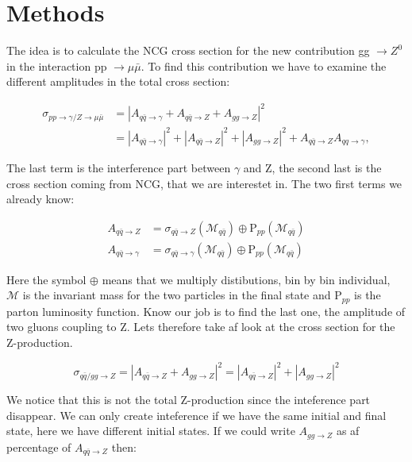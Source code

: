 \section{Methods}
The idea is to calculate the NCG cross section for the new contribution gg $\rightarrow Z^0$ in the interaction pp $\rightarrow \mu \bar \mu$. To find this contribution we have to examine the different amplitudes in the total cross section:

\begin{align}
\sigma_{pp \rightarrow \gamma/ Z \rightarrow \mu \bar \mu} &= |A_{q \bar q \rightarrow \gamma} + A_{q \bar q \rightarrow Z} + A_{gg \rightarrow Z}|^{2} \nonumber \\
&= |A_{q \bar q \rightarrow \gamma}|^{2} + |A_{q \bar q \rightarrow Z}|^ {2} + |A_{gg \rightarrow Z}|^{2} + A_{q \bar q \rightarrow Z }A_{qq \rightarrow \gamma},
\end{align}

The last term is the interference part between $\gamma$ and Z, the second last is the cross section coming from NCG, that we are interestet in. The two first terms we already know:

\begin{align}
A_{q \bar q \rightarrow Z} &= \sigma_{q \bar q \rightarrow Z} (\mathcal{M}_{q \bar q}) \oplus \textrm{P}_{pp}(\mathcal{M}_{q \bar q}) \nonumber \\ 
A_{q \bar q \rightarrow \gamma} &= \sigma_{q \bar q \rightarrow  \gamma}( \mathcal{M}_{q \bar q}) \oplus \textrm{P}_{pp}(\mathcal{M}_{q \bar q})
\end{align}

Here the symbol $\oplus$ means that we multiply distibutions, bin by bin individual, $\mathcal{M}$ is the invariant mass for the two particles in the final state and P$_{pp}$ is the parton luminosity function. Know our job is to find the last one, the amplitude of two gluons coupling to Z. Lets therefore take af look at the cross section for the Z-production. 

\begin{equation}
\sigma_{q \bar q/gg \rightarrow Z} = |A_{q \bar q \rightarrow Z} + A_{gg \rightarrow Z}|^{2}=|A_{q \bar q \rightarrow Z}|^{2}+|A_{gg \rightarrow Z}|^{2}
\end{equation}

We notice that this is not the total Z-production since the inteference part disappear. We can only create inteference if we have the same initial and final state, here we have different initial states. If we could write $A_{gg \rightarrow Z}$ as af percentage of $A_{q \bar q \rightarrow Z}$ then:


